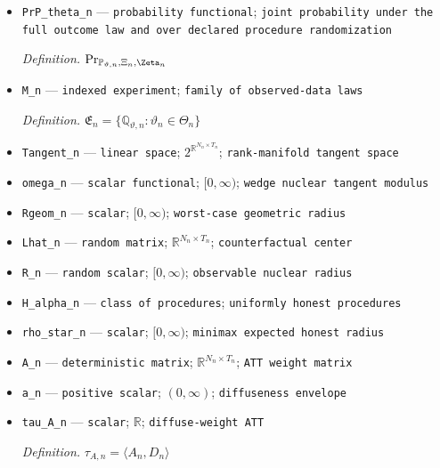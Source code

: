 \documentclass{article}
\begin{document}
\begin{itemize}
  \par\smallskip\noindent\emph{Definition.} \(\mathbb E_{\mathbb Q_{\vartheta,n},\Xi_n,\Zeta_n}\)
  \item \texttt{PrP\_\allowbreak{}theta\_\allowbreak{}n} --- \texttt{probability functional}; \texttt{joint probability under the full outcome law and over declared procedure randomization}
  \par\smallskip\noindent\emph{Definition.} \(\Pr_{\mathbb P_{\vartheta,n},\Xi_n,\Zeta_n}\)
  \item \texttt{M\_\allowbreak{}n} --- \texttt{indexed experiment}; \texttt{family of observed-\allowbreak{}data laws}
  \par\smallskip\noindent\emph{Definition.} \(\mathfrak E_n=\{\mathbb Q_{\vartheta,n}:\vartheta_n\in\Theta_n\}\)
  \item \texttt{Tangent\_\allowbreak{}n} --- \texttt{linear space}; \(2^{\mathbb R^{N_n\times T_n}}\); \texttt{rank-\allowbreak{}manifold tangent space}
  \item \texttt{omega\_\allowbreak{}n} --- \texttt{scalar functional}; \([0,\infty)\); \texttt{wedge nuclear tangent modulus}
  \item \texttt{Rgeom\_\allowbreak{}n} --- \texttt{scalar}; \([0,\infty)\); \texttt{worst-\allowbreak{}case geometric radius}
  \item \texttt{Lhat\_\allowbreak{}n} --- \texttt{random matrix}; \(\mathbb R^{N_n\times T_n}\); \texttt{counterfactual center}
  \item \texttt{R\_\allowbreak{}n} --- \texttt{random scalar}; \([0,\infty)\); \texttt{observable nuclear radius}
  \item \texttt{H\_\allowbreak{}alpha\_\allowbreak{}n} --- \texttt{class of procedures}; \texttt{uniformly honest procedures}
  \item \texttt{rho\_\allowbreak{}star\_\allowbreak{}n} --- \texttt{scalar}; \([0,\infty)\); \texttt{minimax expected honest radius}
  \item \texttt{A\_\allowbreak{}n} --- \texttt{deterministic matrix}; \(\mathbb R^{N_n\times T_n}\); \texttt{ATT weight matrix}
  \item \texttt{a\_\allowbreak{}n} --- \texttt{positive scalar}; \((0,\infty)\); \texttt{diffuseness envelope}
  \item \texttt{tau\_\allowbreak{}A\_\allowbreak{}n} --- \texttt{scalar}; \(\mathbb R\); \texttt{diffuse-\allowbreak{}weight ATT}
  \par\smallskip\noindent\emph{Definition.} \(\tau_{A,n}=\langle A_n,D_n\rangle\)

\end{itemize}
\end{document}
